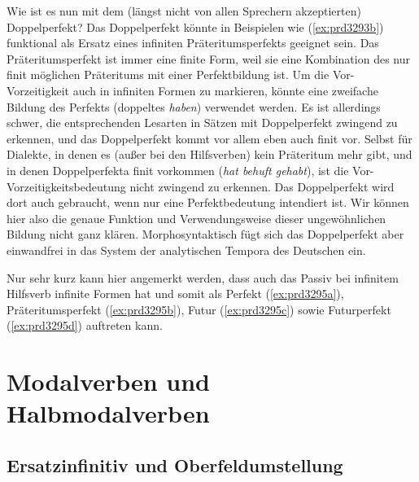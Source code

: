 Wie ist es nun mit dem (längst nicht von allen Sprechern akzeptierten) Doppelperfekt?
Das Doppelperfekt könnte in Beispielen wie (\ref{ex:prd3293b}) funktional als Ersatz eines infiniten Präteritumsperfekts geeignet sein.
Das Präteritumsperfekt ist immer eine finite Form, weil sie eine Kombination des nur finit möglichen Präteritums mit einer Perfektbildung ist.
Um die Vor-Vorzeitigkeit auch in infiniten Formen zu markieren, könnte eine zweifache Bildung des Perfekts (doppeltes \textit{haben}) verwendet werden.
Es ist allerdings schwer, die entsprechenden Lesarten in Sätzen mit Doppelperfekt zwingend zu erkennen, und das Doppelperfekt kommt vor allem eben auch finit vor.
Selbst für Dialekte, in denen es (außer bei den Hilfsverben) kein Präteritum mehr gibt, und in denen Doppelperfekta finit vorkommen (\textit{hat behuft gehabt}), ist die Vor-Vorzeitigkeitsbedeutung nicht zwingend zu erkennen.
Das Doppelperfekt wird dort auch gebraucht, wenn nur eine Perfektbedeutung intendiert ist.
Wir können hier also die genaue Funktion und Verwendungsweise dieser ungewöhnlichen Bildung nicht ganz klären.
Morphosyntaktisch fügt sich das Doppelperfekt aber einwandfrei in das System der analytischen Tempora des Deutschen ein.

Nur sehr kurz kann hier angemerkt werden, dass auch das Passiv bei infinitem Hilfsverb infinite Formen hat und somit als Perfekt (\ref{ex:prd3295a}), Präteritumsperfekt (\ref{ex:prd3295b}), Futur (\ref{ex:prd3295c}) sowie Futurperfekt (\ref{ex:prd3295d}) auftreten kann.

\begin{exe}
  \ex\label{ex:prd3295} 
  \begin{xlist}
    \ex{\label{ex:prd3295d} dass das Pferd [[behuft geworden] sein] wird]}
  \end{xlist}
\end{exe}

\section{Modalverben und Halbmodalverben}

\label{sec:modalverbkonstruktionen}

\subsection{Ersatzinfinitiv und Oberfeldumstellung}

